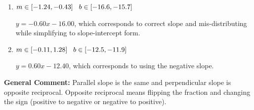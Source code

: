 \documentclass{extbook}[14pt]
\begin{document}
\begin{enumerate}
{\begin{enumerate}[label=\Alph*.]
 $y = -0.60x + 1.60$, which corresponds to using the correct slope and getting the negative $y$-intercept.
\item \( m \in [-1.24, -0.43] \hspace*{3mm} b \in [-16.6, -15.7] \)

 $y = -0.60x - 16.00$, which corresponds to correct slope and mis-distributing while simplifying to slope-intercept form.
\item \( m \in [-0.11, 1.28] \hspace*{3mm} b \in [-12.5, -11.9] \)

 $y = 0.60x - 12.40$, which corresponds to using the negative slope.
\end{enumerate}

\textbf{General Comment:} Parallel slope is the same and perpendicular slope is opposite reciprocal. Opposite reciprocal means flipping the fraction and changing the sign (positive to negative or negative to positive).
}
\end{enumerate}
\end{document}
